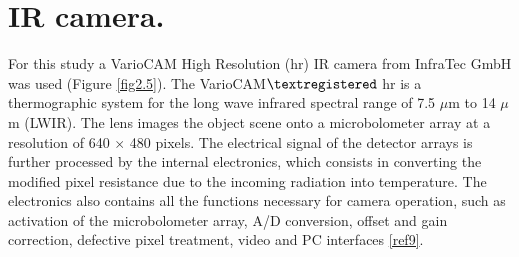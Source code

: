 	\section{IR camera.}\label{section2.3}
	
		For this study a VarioCAM High Resolution (hr) IR camera from InfraTec GmbH was used (Figure \ref{fig2.5}). The VarioCAM$\textregistered$ hr is a thermographic system for the long wave infrared spectral range of 7.5 $\mu$m to 14 $\mu$m (LWIR). The lens images the object scene onto a microbolometer array at a resolution of 640 $\times$ 480 pixels. The electrical signal of the detector arrays is further processed by the internal electronics, which consists in converting the modified pixel resistance due to the incoming radiation into temperature. The electronics also contains all the functions necessary for camera operation, such as activation of the microbolometer array, A/D conversion, offset and gain correction, defective pixel treatment, video and PC interfaces \ref{ref9}.
		
